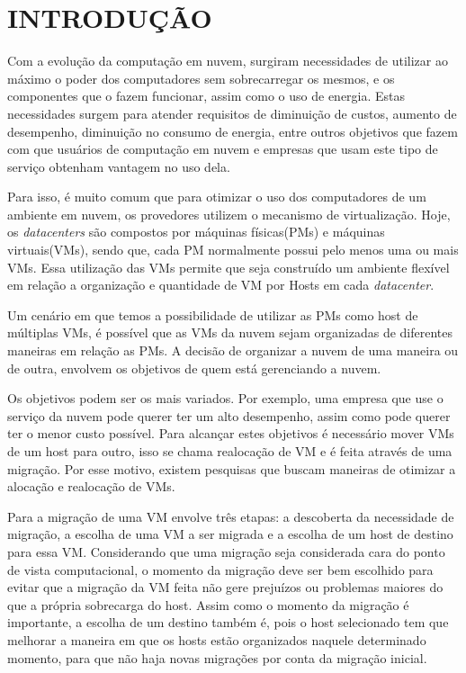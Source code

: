 \chapter{INTRODUÇÃO}
\label{chap:introducao}

Com a evolução da computação em nuvem, surgiram necessidades de utilizar ao 
máximo o poder dos computadores sem sobrecarregar os mesmos, e os componentes que o fazem funcionar,
assim como o uso de energia. Estas necessidades surgem para atender 
requisitos de diminuição de custos, aumento de desempenho, diminuição no consumo de energia,
entre outros objetivos que fazem com que usuários de computação em nuvem e empresas que usam 
este tipo de serviço obtenham vantagem no uso dela.

Para isso, é muito comum que para otimizar o uso dos computadores de um ambiente em nuvem, 
os provedores utilizem o mecanismo de virtualização. Hoje, os \textit{datacenters} são compostos 
por máquinas físicas(PMs) e máquinas virtuais(VMs), sendo que, cada PM normalmente possui 
pelo menos uma ou mais VMs. Essa utilização das VMs permite que seja construído um ambiente flexível
em relação a organização e quantidade de VM por Hosts em cada \textit{datacenter}.

Um cenário em que temos a possibilidade de utilizar as PMs como host de múltiplas VMs,
é possível que as VMs da nuvem sejam organizadas de diferentes maneiras em relação as PMs. A decisão
de organizar a nuvem de uma maneira ou de outra, envolvem os objetivos de quem está gerenciando a nuvem. 
 
Os objetivos podem ser os mais variados. Por exemplo, uma empresa que 
use o serviço da nuvem pode querer ter um alto desempenho, assim como pode querer ter o menor custo 
possível. Para alcançar estes objetivos é necessário mover VMs de um host para outro, isso se chama
realocação de VM e é feita através de uma migração. 
Por esse motivo, existem pesquisas que buscam maneiras de otimizar a alocação e realocação de VMs.

Para \cite{beloglazov2012energy} a migração de uma VM envolve três etapas: a descoberta da necessidade de migração, 
a escolha de uma VM a ser migrada e a escolha de um host de destino para essa VM.
Considerando que uma migração seja considerada cara do ponto de vista computacional, 
o momento da migração deve ser bem escolhido para evitar que a migração da VM feita não gere  
prejuízos ou problemas maiores do que a própria sobrecarga do host. 
Assim como o momento da migração é importante, a escolha de um destino também é, 
pois o host selecionado tem que melhorar a maneira em que os hosts estão organizados naquele determinado momento, 
para que não haja novas migrações por conta da migração inicial.

